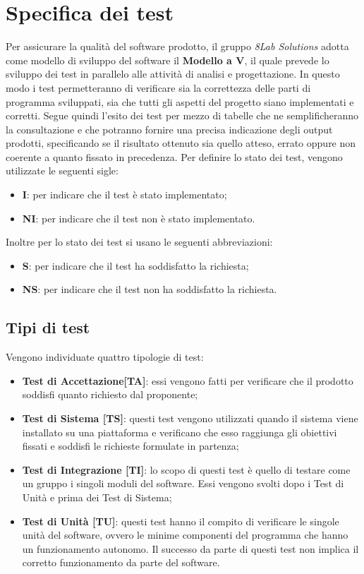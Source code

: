 \section{Specifica dei test}
Per assicurare la qualità del software prodotto, il gruppo \textit{8Lab
Solutions} adotta come modello di sviluppo del software il
\textbf{Modello a V\glo}, il quale prevede lo sviluppo dei test in parallelo alle
attività di analisi e progettazione. In questo modo i test permetteranno di
verificare sia la correttezza delle parti di programma sviluppati, sia che
tutti gli aspetti del progetto siano implementati e corretti. 
Segue quindi l'esito dei test per mezzo di tabelle che ne
semplificheranno la consultazione e che potranno fornire una precisa indicazione 
degli output prodotti, specificando se il risultato ottenuto sia quello atteso, errato
oppure non coerente a quanto fissato in precedenza.
Per definire lo stato dei test, vengono utilizzate le seguenti sigle:
\begin{itemize}
	\item \textbf{I}: per indicare che il test è stato implementato;
	\item \textbf{NI}: per indicare che il test non è stato implementato.
\end{itemize}
Inoltre per lo stato dei test si usano le seguenti abbreviazioni:
\begin{itemize}
	\item \textbf{S}: per indicare che il test ha soddisfatto la richiesta;
	\item \textbf{NS}: per indicare che il test non ha soddisfatto la richiesta.
\end{itemize}

\subsection{Tipi di test}
Vengono individuate quattro tipologie di test:
\begin{itemize}
	\item \textbf{Test di Accettazione[TA]}: essi vengono fatti per verificare 
		che il prodotto soddisfi quanto richiesto dal proponente;
	\item \textbf{Test di Sistema [TS]}: questi test vengono utilizzati quando il 
		sistema viene installato su una piattaforma e verificano che esso raggiunga gli 
		obiettivi fissati e soddisfi le richieste formulate in partenza;
	\item \textbf{Test di Integrazione [TI]}: lo scopo di questi test è quello di 
		testare come un gruppo i singoli moduli\glo{} del software. Essi vengono svolti 
		dopo i Test di Unità e prima dei Test di Sistema; 
	\item \textbf{Test di Unità [TU]}: questi test hanno il compito di verificare le 
		singole unità del software, ovvero le minime componenti del programma che hanno 
		un funzionamento autonomo. Il successo da parte di questi test non implica il 
		corretto funzionamento da parte del software.		
\end{itemize}

